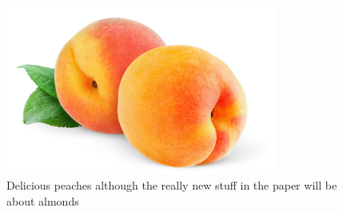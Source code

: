 \documentclass[12pt]{article}
\newcommand{\beginsupplement}{%
        \setcounter{table}{0}
        \renewcommand{\thetable}{S\arabic{table}}%
        \setcounter{figure}{0}
        \renewcommand{\thefigure}{S\arabic{figure}}%
     }
\begin{document}
\begin{figure}[b]
\centering
   \includegraphics[width=0.8\textwidth]{peachzdfgad.jpg}
  \caption{Delicious peaches although the really new stuff in the paper will be about almonds}
  \label{fig:peach}
\end{figure}
%
\pagebreak
\beginsupplement
\end{document}

